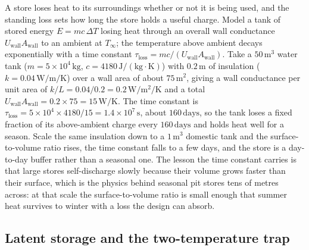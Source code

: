A store loses heat to its surroundings whether or not it is being used, and the
standing loss sets how long the store holds a useful charge. Model a tank of
stored energy $E = m c\,\Delta T$ losing heat through an overall wall conductance
$U_{\text{wall}} A_{\text{wall}}$ to an ambient at $T_\infty$; the temperature
above ambient decays exponentially with a time constant $\tau_{\text{loss}} =
m c/(U_{\text{wall}} A_{\text{wall}})$. Take a $50\,\text{m}^3$ water tank
($m = 5\times 10^4\,\text{kg}$, $c = 4180\,\text{J}/(\text{kg}\cdot\si{\kelvin})$)
with $0.2\,\text{m}$ of insulation ($k = 0.04\,\si{\watt\per\meter\per\kelvin}$)
over a wall area of about $75\,\text{m}^2$, giving a wall conductance per unit area
of $k/L = 0.04/0.2 = 0.2\,\si{\watt\per\meter\squared\per\kelvin}$ and a total
$U_{\text{wall}} A_{\text{wall}} = 0.2\times 75 = 15\,\text{W}/\si{\kelvin}$. The
time constant is $\tau_{\text{loss}} = 5\times 10^4\times 4180/15 = 1.4\times 10^7\,
\text{s}$, about $160\,\text{days}$, so the tank loses a fixed fraction of its
above-ambient charge every $160\,\text{days}$ and holds heat well for a season.
Scale the same insulation down to a $1\,\text{m}^3$ domestic tank and the surface-
to-volume ratio rises, the time constant falls to a few days, and the store is a
day-to-day buffer rather than a seasonal one. The lesson the time constant carries
is that large stores self-discharge slowly because their volume grows faster than
their surface, which is the physics behind seasonal pit stores tens of metres
across: at that scale the surface-to-volume ratio is small enough that summer heat
survives to winter with a loss the design can absorb.

\subsection{Latent storage and the two-temperature trap}

